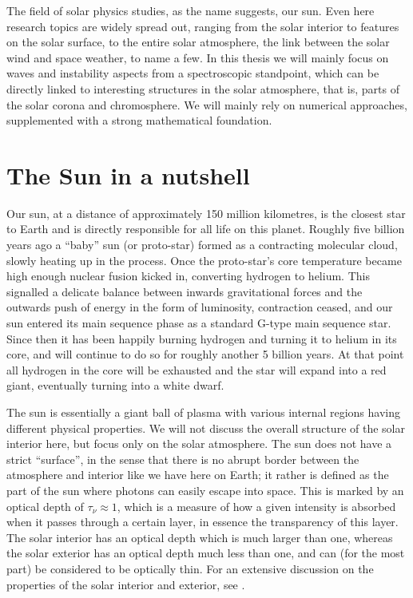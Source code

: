 The field of solar physics studies, as the name suggests, our sun. Even here research topics are widely spread out, ranging from the solar interior to features on the solar surface, to the entire solar atmosphere, the link between the solar wind and space weather, to name a few. In this thesis we will mainly focus on waves and instability aspects from a spectroscopic standpoint, which can be directly linked to interesting structures in the solar atmosphere, that is, parts of the solar corona and chromosphere. We will mainly rely on numerical approaches, supplemented with a strong mathematical foundation.


\section{The Sun in a nutshell}
Our sun, at a distance of approximately 150 million kilometres, is the closest star to Earth and is directly responsible for all life on this planet. Roughly five billion years ago a ``baby'' sun (or proto-star) formed as a contracting molecular cloud, slowly heating up in the process. Once the proto-star's core temperature became high enough nuclear fusion kicked in, converting hydrogen to helium. This signalled a delicate balance between inwards gravitational forces and the outwards push of energy in the form of luminosity, contraction ceased, and our sun entered its main sequence phase as a standard G-type main sequence star. Since then it has been happily burning hydrogen and turning it to helium in its core, and will continue to do so for roughly another 5 billion years. At that point all hydrogen in the core will be exhausted and the star will expand into a red giant, eventually turning into a white dwarf.

The sun is essentially a giant ball of plasma with various internal regions having different physical properties. We will not discuss the overall structure of the solar interior here, but focus only on the solar atmosphere. The sun does not have a strict ``surface'', in the sense that there is no abrupt border between the atmosphere and interior like we have here on Earth; it rather is defined as the part of the sun where photons can easily escape into space. This is marked by an optical depth of $\tau_\nu \approx 1$, which is a measure of how a given intensity is absorbed when it passes through a certain layer, in essence the transparency of this layer. The solar interior has an optical depth which is much larger than one, whereas the solar exterior has an optical depth much less than one, and can (for the most part) be considered to be optically thin. For an extensive discussion on the properties of the solar interior and exterior, see \citet{book_priest}.

